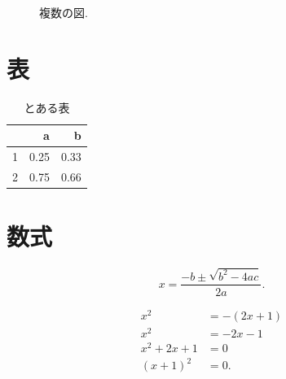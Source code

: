\begin{figure}[ht]
\centering 
{}
\caption{複数の図.}
\label{fig:examples}
\end{figure}




\section{表}
\begin{table}[ht]
\centering
\begin{tabular}{m{1cm}|rr}
& a & b\\ 
\hline
1& 0.25 & 0.33\\
2& 0.75 & 0.66\\
\end{tabular}
\caption{とある表}\label{table:example}
\end{table}


\section{数式}

\begin{equation}
x = \frac{-b \pm \sqrt{b^2-4ac}}{2a}. \label{eq:example}
\end{equation}

\begin{align}
x^2 &= -(2x +1) \\
x^2 &= -2x -1 \nonumber\\
x^2+2x +1 &= 0 \label{eq:example2}\\
(x+1)^2 &=0 \label{eq:example3}.
\end{align}

